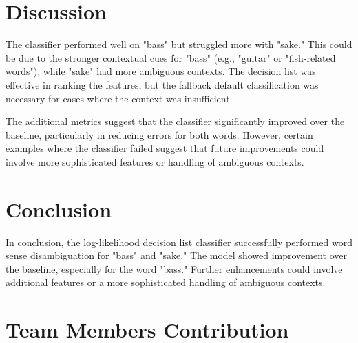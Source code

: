 \documentclass[journal,onecolumn]{IEEEtran}
\begin{document}
\section{Discussion}
The classifier performed well on "bass" but struggled more with "sake." This could be due to the stronger contextual cues for "bass" (e.g., "guitar" or "fish-related words"), while "sake" had more ambiguous contexts. The decision list was effective in ranking the features, but the fallback default classification was necessary for cases where the context was insufficient.

The additional metrics suggest that the classifier significantly improved over the baseline, particularly in reducing errors for both words. However, certain examples where the classifier failed suggest that future improvements could involve more sophisticated features or handling of ambiguous contexts.

\section{Conclusion}
In conclusion, the log-likelihood decision list classifier successfully performed word sense disambiguation for "bass" and "sake." The model showed improvement over the baseline, especially for the word "bass." Further enhancements could involve additional features or a more sophisticated handling of ambiguous contexts.


\section{Team Members Contribution}
\begin{table}[htbp]\fontsize{6}{7.2}\selectfont
{}

    \label{tab:my_label}
\end{table}


  
\end{document}
